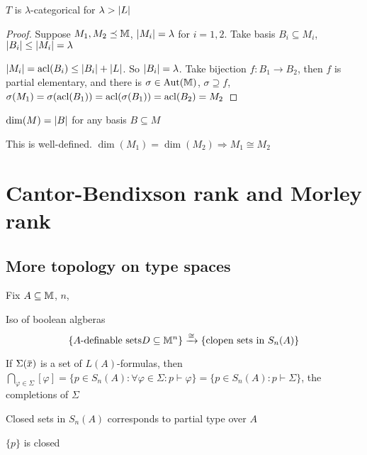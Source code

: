 \documentclass[11pt]{article}
\begin{document}
\begin{theorem}[]
\(T\) is \(\lambda\)-categorical for \(\lambda>\abs{L}\)
\end{theorem}

\begin{proof}
Suppose \(M_1,M_2\preceq\mathbb{M}\), \(\abs{M_i}=\lambda\) for \(i=1,2\). Take
basis \(B_i\subseteq M_i\), \(\abs{B_i}\le\abs{M_i}=\lambda\)

\(\abs{M_i}=\acl(B_i)\le\abs{B_i}+\abs{L}\). So \(\abs{B_i}=\lambda\). Take bijection \(f:B_1\to B_2\),
then \(f\) is partial elementary, and there
is \(\sigma\in\operatorname{\text{Aut}}(\mathbb{M})\), \(\sigma\supseteq f\), \(\sigma(M_1)=\sigma(\operatorname{acl}(B_1))=\operatorname{acl}(\sigma(B_1))=\operatorname{acl}(B_2)=M_2\)
\end{proof}

\begin{definition}[]
\(\dim(M)=\abs{B}\) for any basis \(B\subseteq M\)
\end{definition}

\begin{fact}[]
This is well-defined. \(\dim(M_1)=\dim(M_2)\Rightarrow M_1\cong M_2\)
\end{fact}

\section{Cantor-Bendixson rank and Morley rank}
\label{sec:org011e2cf}
\subsection{More topology on type spaces}
\label{sec:org14afce2}
Fix \(A\subseteq\mathbb{M}\), \(n\),

Iso of boolean algberas
\begin{equation*}
\{A\text{-definable sets}D\subseteq\mathbb{M}^n\}\xrightarrow{\cong}\{\text{clopen sets in }S_n(A)\}
\end{equation*}
\begin{remark}
If \(\Sigma(\barx)\) is a set of \(L(A)\)-formulas,
then \(\bigcap_{\varphi\in\Sigma}[\varphi]=\{p\in S_n(A):\forall\varphi\in\Sigma:p\vdash\varphi\}=\{p\in S_n(A):p\vdash\Sigma\}\), the completions of \(\Sigma\)

Closed sets in \(S_n(A)\) corresponds to partial type over \(A\)
\end{remark}

\begin{fact}[]
\(\{p\}\) is closed
\end{fact}
\end{document}
